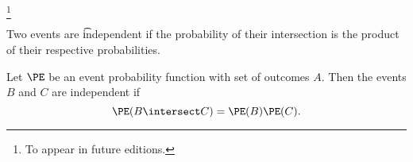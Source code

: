 


\footnote{To appear in future editions.}


Two events are \t{independent} if the probability of their intersection is the product of their respective probabilities.


Let $\PE$ be an
event probability function
with set of outcomes $A$.
Then the events $B$ and $C$
are independent if
\[
  \PE(B \intersect C) = \PE(B)\PE(C).
\]

\blankpage
